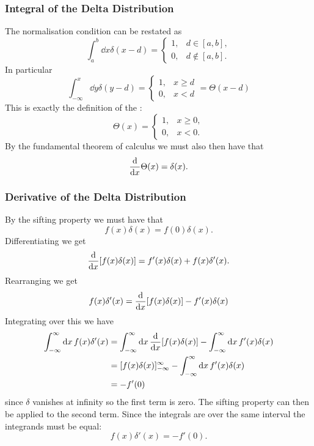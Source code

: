 \documentclass[a4paper]{article}
\begin{document}
    \subsubsection{Integral of the Delta Distribution}
    The normalisation condition can be restated as
    \[
        \int_a^b \dd{x} \delta(x - d) = 
        \begin{cases}
            1, & d\in[a, b],\\
            0, & d\notin[a, b].
        \end{cases}
    \]
    In particular
    \[
        \int_{-\infty}^{x} \dd{y} \delta(y - d) =
        \begin{cases}
            1, & x \ge d\\
            0, & x < d
        \end{cases}
        = \Theta(x - d)
    \]
    This is exactly the definition of the :
    \[
        \Theta(x) =
        \begin{cases}
            1, & x \ge 0,\\
            0, & x < 0.
        \end{cases}
    \]
    By the fundamental theorem of calculus we must also then have that
    \[\dv{x}\Theta(x) = \delta(x).\]
    
    \subsubsection{Derivative of the Delta Distribution}
    By the sifting property we must have that
    \[f(x)\delta(x) = f(0)\delta(x).\]
    Differentiating we get
    \[\dv{x}[f(x)\delta(x)] = f'(x)\delta(x) + f(x)\delta'(x).\]
    Rearranging we get
    \[f(x)\delta'(x) = \dv{x}[f(x)\delta(x)] - f'(x)\delta(x)\]
    Integrating over this we have
    \begin{align*}
        \int_{-\infty}^{\infty} \dd{x} f(x)\delta'(x) &= \int_{-\infty}^{\infty} \dd{x}\dv{x}[f(x)\delta(x)] - \int_{-\infty}^{\infty} \dd{x} f'(x)\delta(x)\\
        &= [f(x)\delta(x)]_{-\infty}^{\infty} - \int_{-\infty}^{\infty} \dd{x}f'(x)\delta(x)\\
        &= -f'(0)
    \end{align*}
    since \(\delta\) vanishes at infinity so the first term is zero.
    The sifting property can then be applied to the second term.
    Since the integrals are over the same interval the integrands must be equal:
    \[f(x)\delta'(x) = -f'(0).\]
    
\end{document}
